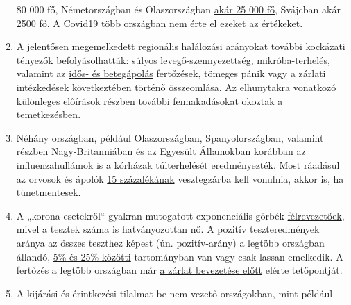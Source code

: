 \begin{enumerate}
  80 000 fő, Németországban és Olaszországban
  \href{https://www.sciencedirect.com/science/article/pii/S1201971219303285}{akár
  25 000 fő}, Svájcban akár 2500 fő. A Covid19 több országban
  \href{https://www.euromomo.eu/graphs-and-maps/}{nem érte el} ezeket az
  értékeket.
\item
  A jelentősen megemelkedett regionális halálozási arányokat további
  kockázati tényezők befolyásolhatták: súlyos
  \href{https://www.theguardian.com/environment/2020/apr/20/air-pollution-may-be-key-contributor-to-covid-19-deaths-study?utm_medium}{levegő-szennyezettség},
  \href{https://www.ansa.it/english/news/science_tecnology/2019/11/19/italy-top-in-eu-in-antibiotic-resistance_369e0123-0107-445e-8c17-f11932c9d27c.html}{mikróba-terhelés},
  valamint az
  \href{https://swprs.org/covid-19-a-report-from-italy/}{idős- és
  betegápolás} fertőzések, tömeges pánik vagy a zárlati intézkedések
  következtében történő összeomlása. Az elhunytakra vonatkozó különleges
  előírások részben további fennakadásokat okoztak a
  \href{https://www.ecdc.europa.eu/sites/default/files/documents/COVID-19-safe-handling-of-bodies-or-persons-dying-from-COVID19.pdf}{temetkezésben}.
\item
  Néhány országban, például Olaszországban, Spanyolországban, valamint
  részben Nagy-Britanniában és az Egyesült Államokban korábban az
  influenzahullámok is a
  \href{https://off-guardian.org/2020/04/02/coronavirus-fact-check-1-flu-doesnt-overwhelm-our-hospitals/}{kórházak
  túlterhelését} eredményezték. Most ráadásul az orvosok és ápolók
  \href{https://www.reuters.com/article/us-health-coronavirus-spain-morgue-idUSKBN21B1PP}{15
  százalékának} vesztegzárba kell vonulnia, akkor is, ha tünetmentesek.
\item
  A „korona-esetekről`` gyakran mutogatott exponenciális görbék
  \href{https://multipolar-magazin.de/artikel/coronavirus-regierung-ignoriert-daten}{félrevezetőek},
  mivel a tesztek száma is hatványozottan nő. A pozitív teszteredmények
  aránya az összes teszthez képest (ún. pozitív-arány) a legtöbb
  országban állandó,
  \href{https://swprs.org/rate-of-positive-covid19-tests/}{5\% és 25\%
  közötti} tartományban van vagy csak lassan emelkedik. A fertőzés a
  legtöbb országban már
  \href{https://www.dailymail.co.uk/news/article-8235979/UKs-coronavirus-crisis-peaked-lockdown-Expert-argues-draconian-measures-unnecessary.html}{a
  zárlat bevezetése előtt} elérte tetőpontját.
\item
  A kijárási és érintkezési tilalmat be nem vezető országokban, mint
  például

\end{enumerate}

